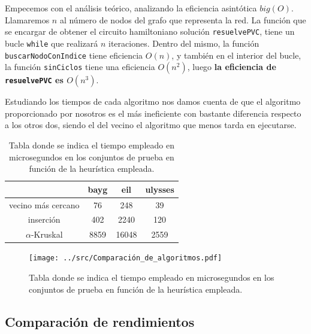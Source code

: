 


Empecemos con el análisis teórico, analizando la eficiencia asintótica $big(O)$. Llamaremos $n$ al número 
de nodos del grafo que representa la red. La función que se encargar de obtener el circuito hamiltoniano 
solución \texttt{resuelvePVC}, tiene un bucle \texttt{while} que realizará $n$ iteraciones. Dentro del mismo, 
la función \texttt{buscarNodoConIndice} tiene eficiencia $O(n)$, y también en el interior del bucle, la 
función \texttt{sinCiclos} tiene una eficiencia $O(n^2)$, luego \textbf{la eficiencia de \texttt{resuelvePVC} es $O(n^3)$}.


Estudiando los tiempos de cada algoritmo nos damos cuenta de que el algoritmo proporcionado por nosotros es el más ineficiente
con bastante diferencia respecto a los otros dos, siendo el del vecino el algoritmo que menos tarda en ejecutarse.

\begin{table}[H]
  \centering
  \begin{tabular}{|c|c|c|c|}
    \hline
    & bayg & eil & ulysses \\
    \hline
    vecino más cercano & 76 & 248 & 39 \\
    \hline
    inserción & 402 & 2240 & 120 \\
    \hline
    $\alpha$-Kruskal & 8859 & 16048 & 2559 \\
    \hline
  \end{tabular}
  \caption{Tabla donde se indica el tiempo empleado en microsegundos en los conjuntos de prueba en función de la heurística empleada.}
\end{table}


\begin{figure}[H]
  \centering
  \texttt{[image: ../src/Comparación\_de\_algoritmos.pdf]}
  \caption{Tabla donde se indica el tiempo empleado en microsegundos en los conjuntos de prueba en función de la heurística empleada.}
\end{figure}

\subsection{Comparación de rendimientos}

